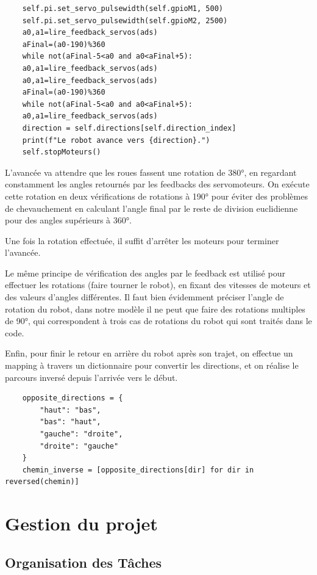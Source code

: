\documentclass[a4paper,12pt]{report}  %
\begin{document}
\begin{lstlisting}
	self.pi.set_servo_pulsewidth(self.gpioM1, 500)
	self.pi.set_servo_pulsewidth(self.gpioM2, 2500)
	a0,a1=lire_feedback_servos(ads)
	aFinal=(a0-190)%360
	while not(aFinal-5<a0 and a0<aFinal+5):
	a0,a1=lire_feedback_servos(ads)
	a0,a1=lire_feedback_servos(ads)
	aFinal=(a0-190)%360
	while not(aFinal-5<a0 and a0<aFinal+5):
	a0,a1=lire_feedback_servos(ads)
	direction = self.directions[self.direction_index]
	print(f"Le robot avance vers {direction}.")
	self.stopMoteurs()
\end{lstlisting}


L’avancée va attendre que les roues fassent une rotation de 380°, en regardant constamment les angles retournés par les feedbacks des servomoteurs. On exécute cette rotation en deux vérifications de rotations à 190° pour éviter des problèmes de chevauchement en calculant l’angle final par le reste de division euclidienne pour des angles supérieurs à 360°.

Une fois la rotation effectuée, il suffit d’arrêter les moteurs pour terminer l’avancée.

Le même principe de vérification des angles par le feedback est utilisé pour effectuer les rotations (faire tourner le robot), en fixant des vitesses de moteurs et des valeurs d’angles différentes. Il faut bien évidemment préciser l’angle de rotation du robot, dans notre modèle il ne peut que faire des rotations multiples de 90°, qui correspondent à trois cas de rotations du robot qui sont traités dans le code.

Enfin, pour finir le retour en arrière du robot après son trajet, on effectue un mapping à travers un dictionnaire pour convertir les directions, et on réalise le parcours inversé depuis l’arrivée vers le début.

\begin{lstlisting}
	opposite_directions = {
		"haut": "bas",
		"bas": "haut",
		"gauche": "droite",
		"droite": "gauche"
	}
	chemin_inverse = [opposite_directions[dir] for dir in reversed(chemin)]
\end{lstlisting}


\section{Gestion du projet}

\subsection{Organisation des Tâches} 
\end{document}
